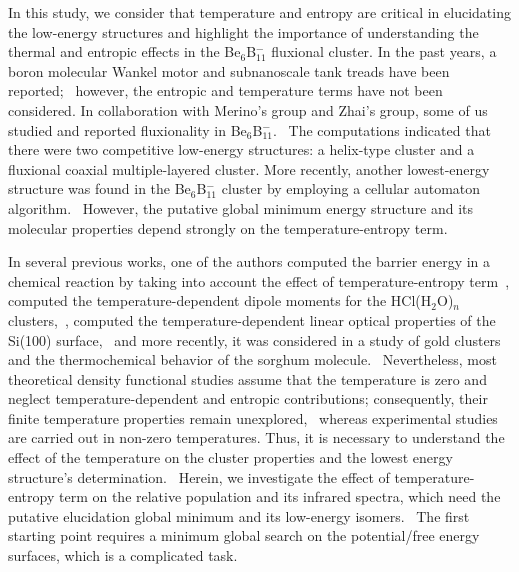 \documentclass[prb,aps,preprint,showkeys,showpacs]{revtex4}
\begin{document}
In this study, we consider that temperature and entropy are critical in elucidating the low-energy structures and highlight the importance of understanding the thermal and entropic effects in the Be$_6$B$_{11}^{-}$ fluxional cluster.
In the past years, a boron molecular Wankel motor\cite{Jimenez-Halla,Martinez-Guajardo,Moreno,Jalife,Truong,Fagiani,Yonggang} and subnanoscale tank treads have been reported;~\cite{Ying-Jin2015,Zhai2017} however, the entropic and temperature terms have not been considered.
In collaboration with Merino's group and Zhai's group, some of us studied and reported fluxionality in Be$_6$B$_{11}^{-}$.~\cite{Guo} The computations indicated that there were two competitive low-energy structures: a helix-type cluster and a fluxional coaxial multiple-layered cluster. More recently, another lowest-energy structure was found in the Be$_6$B$_{11}^{-}$ cluster by employing a cellular automaton algorithm.~\cite{Osvaldo} However, the putative global minimum energy structure and its molecular properties depend strongly on the {{temperature-entropy term}}.~\cite{Baletto,Grigoryan,Calvo1,Cahuzac,Foster}

In several previous works, one of the authors computed the barrier energy in a chemical reaction by taking into account the effect of temperature-entropy term~\cite{Dzib}, computed the temperature-dependent dipole moments for the HCl(H$_2$O)$_n$ clusters,~\cite{Vargas-Caamal}, computed the temperature-dependent linear optical properties of the Si(100) surface,~\cite{shkrebtii}  and more recently, it was considered in a study of {{gold clusters~\cite{Goldsmith,Ghiringhelli_2013,Schebarchov}}} and the thermochemical behavior of the sorghum molecule.~\cite{MENDOZAWILSON2020112912} Nevertheless, most theoretical density functional studies assume that the temperature is zero and neglect temperature-dependent and entropic contributions; consequently, their finite temperature properties remain unexplored,~\cite{Seitsonen,Prachi} whereas experimental studies are carried out in non-zero temperatures. Thus, it is necessary to understand the effect of the temperature on the cluster properties and the lowest energy structure's determination.~\cite{Jonathan,Seitsonen,Prachi} Herein, we investigate the effect of temperature-entropy term on the relative population and its infrared spectra, which need the putative elucidation global minimum and its low-energy isomers.~\cite{Zhen,Darby,Doye,Ohno,Baletto} The first starting point requires a minimum global search on the potential/free energy surfaces, which is a complicated task.
\end{document}
